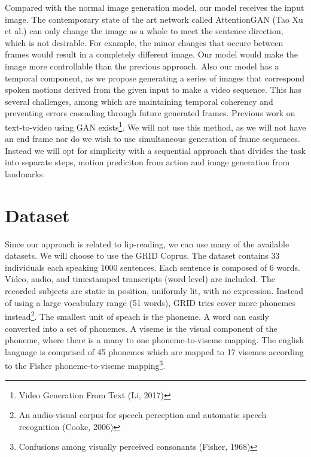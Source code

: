 \documentclass[10pt,twocolumn,letterpaper]{article}
\begin{document}
 Compared with the normal image generation model, our model receives the input image. The contemporary state of the art network called AttentionGAN (Tao Xu et al.) can only change the image as a whole to meet the sentence direction, which is not desirable. For example, the minor changes that occure between frames would result in a completely different image. Our model would make the image more controllable than the previous approach. Also our model has a temporal component, as we propose generating a series of images that correspond spoken motions derived from the given input to make a video sequence. This has several challenges, among which are maintaining temporal coherency and preventing errors cascading through future generated frames. Previous work on text-to-video using GAN exists\footnote{Video Generation From Text (Li, 2017)}. We will not use this method, as we will not have an end frame nor do we wish to use simultaneous generation of frame sequences. Instead we will opt for simplicity with a sequential approach that divides the task into separate steps, motion prediciton from action and image generation from landmarks.


\section{Dataset}
Since our approach is related to lip-reading, we can use many of the available datasets. We will choose to use the GRID Coprus. The dataset contains 33 individuals each speaking 1000 sentences. Each sentence is composed of 6 words. Video, audio, and timestamped transcripts (word level) are included. The recorded subjects are static in position, uniformly lit, with no expression. Instead of using a large vocabulary range (51 words), GRID tries cover more phonemes instead\footnote{An audio-visual corpus for speech perception and automatic speech recognition (Cooke, 2006)}. The smallest unit of speach is the phoneme. A word can easily converted into a set of phonemes. A viseme is the visual component  of the phoneme, where there is a many to one phoneme-to-viseme mapping. The english language is comprised of 45 phonemes which are mapped to 17 visemes according to the Fisher phoneme-to-viseme mapping\footnote{Confusions among visually perceived consonants (Fisher, 1968)}.


\end{document}
